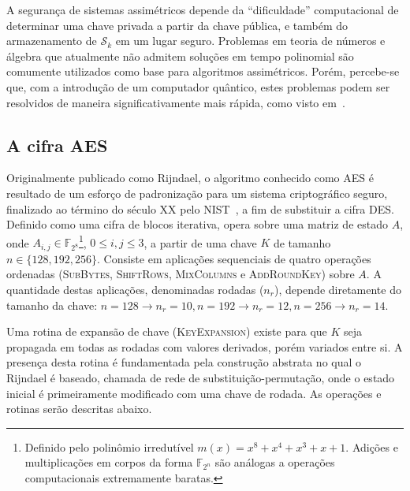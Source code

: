 \documentclass[12pt,notitlepage]{report}
\newcommand{\sk}{\mathcal{S}_k}
\begin{document}
A segurança de sistemas assimétricos depende da ``dificuldade''
computacional de determinar uma chave privada a partir da chave pública,
e também do armazenamento de $\sk{}$ em um lugar seguro. Problemas em
teoria de números e álgebra que atualmente não admitem soluções em tempo
polinomial são comumente utilizados como base para algoritmos assimétricos.
Porém, percebe-se que, com a introdução de um computador quântico, estes
problemas podem ser resolvidos de maneira significativamente mais rápida,
como visto em~\cite{Shor:1997:PAP:264393.264406}.

\subsection{A cifra AES}
\label{subsection:aes}

Originalmente publicado como Rijndael, o algoritmo conhecido como AES é resultado
de um esforço de padronização para um sistema criptográfico seguro, finalizado
ao término do século XX pelo NIST~\cite{Standards2001}, a fim de substituir a cifra DES.
Definido como uma cifra de blocos iterativa, opera
sobre uma matriz de estado $A$, onde $A_{i,j} \in
\mathbb{F}_{2^{8}}$\footnote{Definido pelo polinômio irredutível
$m(x) = x^{8} + x^{4} + x^{3} + x + 1$. Adições e multiplicações em corpos da
forma $\mathbb{F}_{2^n}$ são análogas a operações computacionais extremamente
baratas.}, $0 \leq i, j \leq 3$, a partir de uma chave $K$ de tamanho $n \in \{128, 192,
256\}$. Consiste em aplicações sequenciais de quatro operações ordenadas
(\textsc{SubBytes}, \textsc{ShiftRows}, \textsc{MixColumns} e
\textsc{AddRoundKey}) sobre $A$. A quantidade destas aplicações, denominadas
rodadas ($n_r$), depende diretamente do tamanho da chave: $n = 128 \rightarrow
n_r = 10, n = 192 \rightarrow n_r = 12, n = 256 \rightarrow n_r = 14$.

Uma rotina de expansão de chave (\textsc{KeyExpansion}) existe
para que $K$ seja propagada em todas as rodadas com valores derivados,
porém variados entre si. A presença desta rotina é fundamentada pela
construção abstrata no qual o Rijndael é baseado, chamada de rede de
substituição-permutação, onde o estado inicial é primeiramente modificado
com uma chave de rodada. As operações e rotinas serão descritas abaixo.
\end{document}

